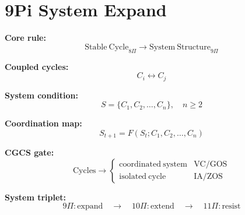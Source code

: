 \section*{9Pi System Expand}

\textbf{Core rule:}
\[
\mathrm{Stable\ Cycle}_{8\Pi}
\rightarrow
\mathrm{System\ Structure}_{9\Pi}
\]

\textbf{Coupled cycles:}
\[
C_i \leftrightarrow C_j
\]

\textbf{System condition:}
\[
S = \{C_1, C_2, \dots, C_n\}, \quad n \geq 2
\]

\textbf{Coordination map:}
\[
S_{t+1} = F(S_t; C_1, C_2, \dots, C_n)
\]

\textbf{CGCS gate:}
\[
\mathrm{Cycles} \rightarrow
\begin{cases}
\mathrm{coordinated\ system} & \text{VC/GOS} \\
\mathrm{isolated\ cycle} & \text{IA/ZOS}
\end{cases}
\]

\textbf{System triplet:}
\[
9\Pi:\mathrm{expand}
\quad\rightarrow\quad
10\Pi:\mathrm{extend}
\quad\rightarrow\quad
11\Pi:\mathrm{resist}
\]
